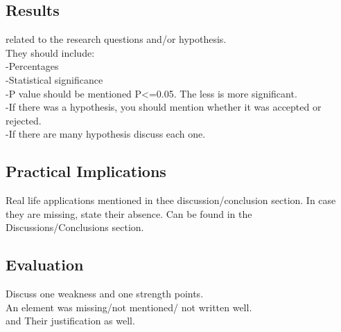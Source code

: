 \documentclass[11pt]{article}
\begin{document}
\subsection{Results}
related to the research questions and/or hypothesis.\\
They should include: \\
-Percentages 
\\ -Statistical significance
\\ -P value should be mentioned P<=0.05. The less is more significant.
\\ -If there was a hypothesis, you should mention whether it was accepted or rejected.
\\ -If there are many hypothesis discuss each one.
\subsection{Practical Implications}
Real life applications mentioned in thee discussion/conclusion section. In case they are missing, state their absence. Can be found in the Discussions/Conclusions section.
\subsection{Evaluation}
Discuss one weakness and one strength points.\\
An element was missing/not mentioned/ not written well. \\ 
and Their justification as well.
\end{document}
